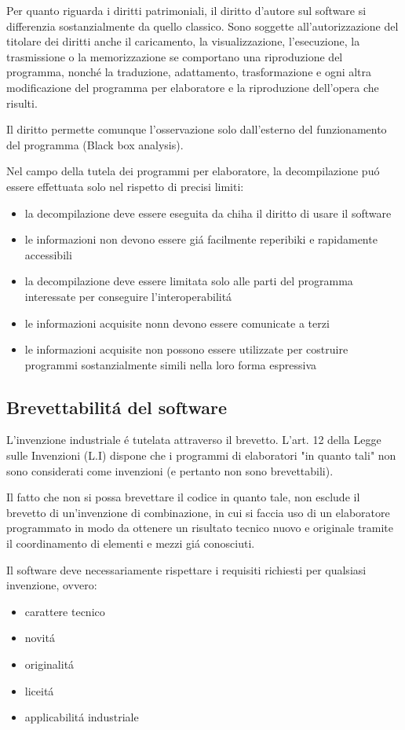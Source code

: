\documentclass{article}
\begin{document}
Per quanto riguarda i diritti patrimoniali, il diritto d'autore sul software si differenzia sostanzialmente da quello classico. Sono soggette all'autorizzazione del titolare dei diritti anche il caricamento, la visualizzazione, l'esecuzione, la trasmissione o la memorizzazione se comportano una riproduzione del programma, nonch\'e la traduzione, adattamento, trasformazione e ogni altra modificazione del programma per elaboratore e la riproduzione dell'opera che risulti.

Il diritto permette comunque l'osservazione solo dall'esterno del funzionamento del programma (Black box analysis).

Nel campo della tutela dei programmi per elaboratore, la decompilazione pu\'o essere effettuata solo nel rispetto di precisi limiti:
\begin{itemize}
    \item la decompilazione deve essere eseguita da chiha il diritto di usare il software
    \item le informazioni non devono essere gi\'a facilmente reperibiki e rapidamente accessibili
    \item la decompilazione deve essere limitata solo alle parti del programma interessate per conseguire l'interoperabilit\'a
    \item le informazioni acquisite nonn devono essere comunicate a terzi
    \item le informazioni acquisite non possono essere utilizzate per costruire programmi sostanzialmente simili nella loro forma espressiva
\end{itemize}

\subsection{Brevettabilit\'a del software}
L'invenzione industriale \'e tutelata attraverso il brevetto. L'art. 12 della Legge sulle Invenzioni (L.I) dispone che i programmi di elaboratori "in quanto tali" non sono considerati come invenzioni (e pertanto non sono brevettabili).

Il fatto che non si possa brevettare il codice in quanto tale, non esclude il brevetto di un'invenzione di combinazione, in cui si faccia uso di un elaboratore programmato in modo da ottenere un risultato tecnico nuovo e originale tramite il coordinamento di elementi e mezzi gi\'a conosciuti.

Il software deve necessariamente rispettare i requisiti richiesti per qualsiasi invenzione, ovvero:
\begin{itemize}
    \item carattere tecnico
    \item novit\'a
    \item originalit\'a
    \item liceit\'a
    \item applicabilit\'a industriale
\end{itemize}
\end{document}
